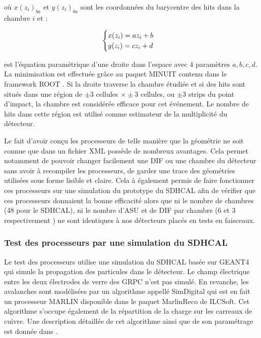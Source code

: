 \begin{itemize}[label=$\bullet$]
	où $x(z_{i})_{ba}$ et $y(z_{i})_{ba}$ sont les coordonnées du barycentre des hits dans la chambre $i$ et :
	
\begin{equation}
\begin{cases}
\strut x(z_i)=az_i+b\\
y(z_i)=cz_i+d
\end{cases}
\end{equation}

est l'équation paramétrique d'une droite dans l'espace avec \num{4} paramètres $a,b,c,d$. La minimisation est effectuée grâce au paquet MINUIT \cite{James:2004xla} contenu dans le framework ROOT \cite{BRUN199781}.
Si la droite traverse la chambre étudiée et si des hits sont situés dans une région de $\pm 3$ cellules $\times\pm 3$ cellules, ou $\pm 3$ strips du point d'impact, la chambre est considérée efficace pour cet événement. Le nombre de hits dans cette région est utilisé comme estimateur de la multiplicité du détecteur.
\end{itemize}

Le fait d'avoir conçu les processeurs de telle manière que la géométrie ne soit connue que dans un fichier XML possède de nombreux avantages. Cela permet notamment de pouvoir changer facilement une DIF ou une chambre du détecteur sans avoir à recompiler les processeurs, de garder une trace des géométries utilisées sous forme lisible et claire. Cela à également permis de faire fonctionner ces processeurs sur une simulation du prototype du SDHCAL afin de vérifier que ces processeurs donnaient la bonne efficacité alors que ni le nombre de chambres (48 pour le SDHCAL), ni le nombre d'ASU et de DIF par chambre (6 et 3 respectivement ) ne sont identiques à nos détecteurs placés en tests en faisceaux.

\subsubsection{Test des processeurs par une simulation du SDHCAL}
Le test des processeurs utilise une simulation du SDHCAL basée sur GEANT4\cite{AGOSTINELLI2003250} qui simule la propagation des particules dans le détecteur. Le champ électrique entre les deux électrodes de verre des GRPC n'est pas simulé. En revanche, les avalanches sont modélisées par un algorithme appellé SimDigital qui est en fait un processeur MARLIN disponible dans le paquet MarlinReco \cite{2007Prama} de ILCSoft. Cet algorithme s'occupe également de la répartition de la charge sur les carreaux de cuivre. Une description détaillée de cet algorithme ainsi que de son paramétrage est donnée dans \cite{steen:tel-01282680}.

